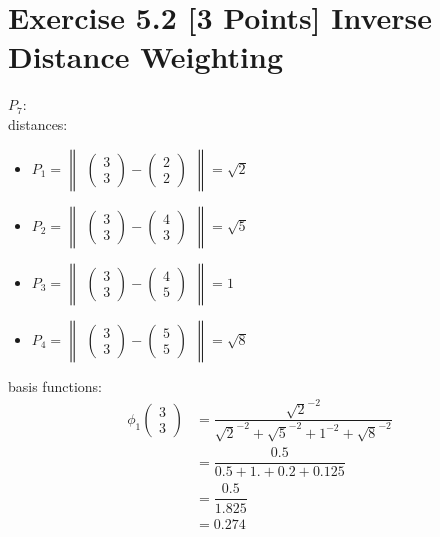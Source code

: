 \documentclass[a4paper]{article}
\begin{document}
\section*{Exercise 5.2 [3 Points] Inverse Distance Weighting}
$ P_7 $:\\
distances:
\begin{itemize}
	\item $ P_1 = \begin{Vmatrix}\begin{pmatrix}
	3 \\
	3
	\end{pmatrix}
	-
	\begin{pmatrix}
	2 \\
	2
	\end{pmatrix}\end{Vmatrix} = \sqrt{2} $
	\item $ P_2 = \begin{Vmatrix}
	\begin{pmatrix}
	3 \\
	3
	\end{pmatrix}
	-
	\begin{pmatrix}
	4 \\
	3
	\end{pmatrix}
	\end{Vmatrix} = \sqrt{5} $
	\item $ P_3 = \begin{Vmatrix}
	\begin{pmatrix}
	3 \\
	3
	\end{pmatrix}
	-
	\begin{pmatrix}
	4 \\
	5
	\end{pmatrix}
	\end{Vmatrix} = 1 $
	\item $ P_4 = \begin{Vmatrix}
	\begin{pmatrix}
	3 \\
	3
	\end{pmatrix}
	-
	\begin{pmatrix}
	5 \\
	5
	\end{pmatrix}
	\end{Vmatrix} = \sqrt{8} $
\end{itemize}
basis functions:
\begin{align*}
\phi_{1}
\begin{pmatrix}
3 \\
3
\end{pmatrix}
& =
\dfrac{
	\sqrt{2}^{-2}
}{
	\sqrt{2}^{-2}
	+
	\sqrt{5}^{-2}
	+
	1^{-2}
	+
	\sqrt{8}^{-2}
} \\
& = \dfrac{0.5}{0.5+1.+0.2+0.125} \\
& = \dfrac{0.5}{1.825}\\
& = 0.274
\end{align*}
\end{document}
